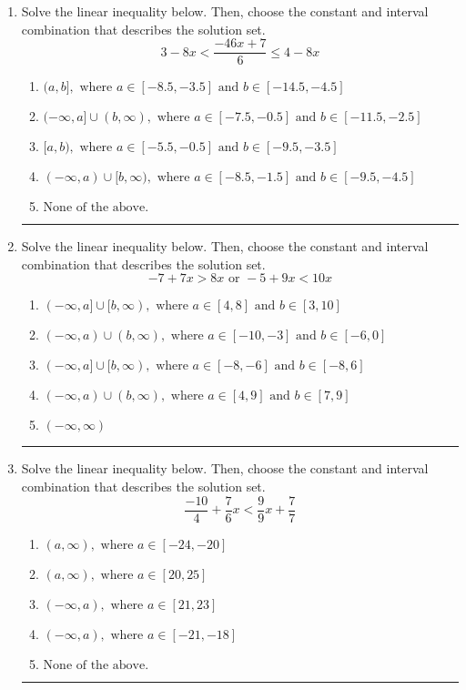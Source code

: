 \documentclass[14pt]{extbook}
\newcommand{\litem}[1]{\item#1\hspace*{-1cm}\rule{\textwidth}{0.4pt}}
\begin{document}
\begin{enumerate}
{\begin{enumerate}[label=\Alph*.]
\end{enumerate} }
\litem{
Solve the linear inequality below. Then, choose the constant and interval combination that describes the solution set.\[ 3 - 8 x < \frac{-46 x + 7}{6} \leq 4 - 8 x \]\begin{enumerate}[label=\Alph*.]
\item \( (a, b], \text{ where } a \in [-8.5, -3.5] \text{ and } b \in [-14.5, -4.5] \)
\item \( (-\infty, a] \cup (b, \infty), \text{ where } a \in [-7.5, -0.5] \text{ and } b \in [-11.5, -2.5] \)
\item \( [a, b), \text{ where } a \in [-5.5, -0.5] \text{ and } b \in [-9.5, -3.5] \)
\item \( (-\infty, a) \cup [b, \infty), \text{ where } a \in [-8.5, -1.5] \text{ and } b \in [-9.5, -4.5] \)
\item \( \text{None of the above.} \)

\end{enumerate} }
\litem{
Solve the linear inequality below. Then, choose the constant and interval combination that describes the solution set.\[ -7 + 7 x > 8 x \text{ or } -5 + 9 x < 10 x \]\begin{enumerate}[label=\Alph*.]
\item \( (-\infty, a] \cup [b, \infty), \text{ where } a \in [4, 8] \text{ and } b \in [3, 10] \)
\item \( (-\infty, a) \cup (b, \infty), \text{ where } a \in [-10, -3] \text{ and } b \in [-6, 0] \)
\item \( (-\infty, a] \cup [b, \infty), \text{ where } a \in [-8, -6] \text{ and } b \in [-8, 6] \)
\item \( (-\infty, a) \cup (b, \infty), \text{ where } a \in [4, 9] \text{ and } b \in [7, 9] \)
\item \( (-\infty, \infty) \)

\end{enumerate} }
\litem{
Solve the linear inequality below. Then, choose the constant and interval combination that describes the solution set.\[ \frac{-10}{4} + \frac{7}{6} x < \frac{9}{9} x + \frac{7}{7} \]\begin{enumerate}[label=\Alph*.]
\item \( (a, \infty), \text{ where } a \in [-24, -20] \)
\item \( (a, \infty), \text{ where } a \in [20, 25] \)
\item \( (-\infty, a), \text{ where } a \in [21, 23] \)
\item \( (-\infty, a), \text{ where } a \in [-21, -18] \)
\item \( \text{None of the above}. \)

\end{enumerate} }
\end{enumerate}
\end{document}
